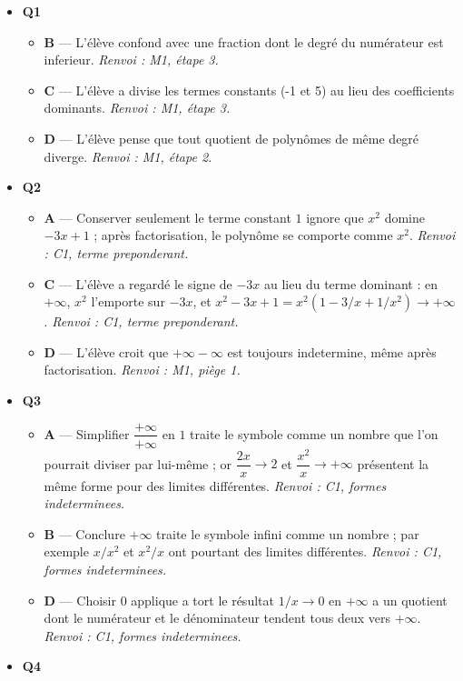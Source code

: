\begin{itemize}
  \item \textbf{Q1}
  \begin{itemize}
    \item \textbf{B} — L'élève confond avec une fraction dont le degré du numérateur est inferieur. \emph{Renvoi : M1, étape 3.}
    \item \textbf{C} — L'élève a divise les termes constants (-1 et 5) au lieu des coefficients dominants. \emph{Renvoi : M1, étape 3.}
    \item \textbf{D} — L'élève pense que tout quotient de polynômes de même degré diverge. \emph{Renvoi : M1, étape 2.}
  \end{itemize}
  \item \textbf{Q2}
  \begin{itemize}
    \item \textbf{A} — Conserver seulement le terme constant $1$ ignore que $x^2$ domine $-3x+1$ ; après factorisation, le polynôme se comporte comme $x^2$. \emph{Renvoi : C1, terme preponderant.}
    \item \textbf{C} — L'élève a regardé le signe de $-3x$ au lieu du terme dominant : en $+\infty$, $x^2$ l'emporte sur $-3x$, et $x^2-3x+1 = x^2(1-3/x+1/x^2)\to+\infty$. \emph{Renvoi : C1, terme preponderant.}
    \item \textbf{D} — L'élève croit que $+\infty - \infty$ est toujours indetermine, même après factorisation. \emph{Renvoi : M1, piège 1.}
  \end{itemize}
  \item \textbf{Q3}
  \begin{itemize}
    \item \textbf{A} — Simplifier $\dfrac{+\infty}{+\infty}$ en $1$ traite le symbole comme un nombre que l'on pourrait diviser par lui-même ; or $\dfrac{2x}{x}\to2$ et $\dfrac{x^2}{x}\to+\infty$ présentent la même forme pour des limites différentes. \emph{Renvoi : C1, formes indeterminees.}
    \item \textbf{B} — Conclure $+\infty$ traite le symbole infini comme un nombre ; par exemple $x/x^2$ et $x^2/x$ ont pourtant des limites différentes. \emph{Renvoi : C1, formes indeterminees.}
    \item \textbf{D} — Choisir $0$ applique a tort le résultat $1/x\to0$ en $+\infty$ a un quotient dont le numérateur et le dénominateur tendent tous deux vers $+\infty$. \emph{Renvoi : C1, formes indeterminees.}
  \end{itemize}
  \item \textbf{Q4}

\end{itemize}

